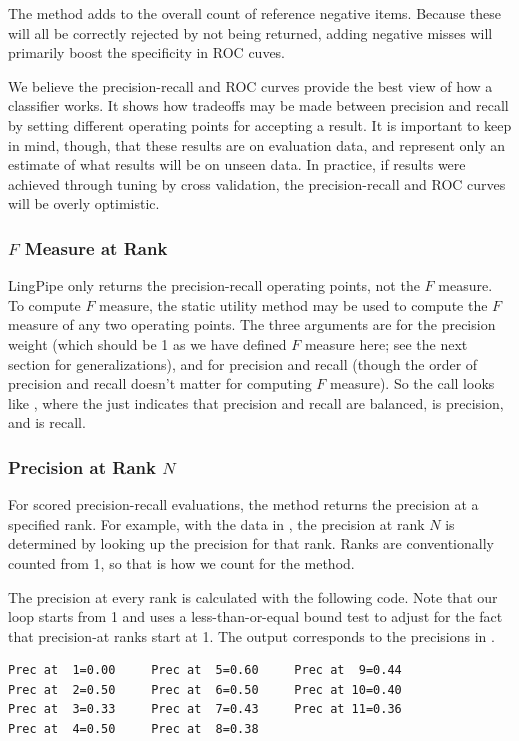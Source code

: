 The method  adds to the overall count of
reference negative items.  Because these will all be correctly
rejected by not being returned, adding negative misses will primarily
boost the specificity in ROC cuves.  

We believe the precision-recall and ROC curves provide the best view
of how a classifier works.  It shows how tradeoffs may be made between
precision and recall by setting different operating points for
accepting a result.  It is important to keep in mind, though, that
these results are on evaluation data, and represent only an estimate
of what results will be on unseen data.  In practice, if results were
achieved through tuning by cross validation, the precision-recall and
ROC curves will be overly optimistic.


\subsubsection{$F$ Measure at Rank}

LingPipe only returns the precision-recall operating points, not the
$F$ measure.  To compute $F$ measure, the static utility method
 may be used to compute the $F$
measure of any two operating points.  The three arguments are for the
precision weight (which should be 1 as we have defined $F$ measure
here; see the next section for generalizations), and for precision and
recall (though the order of precision and recall doesn't matter for
computing $F$ measure). So the call looks like
, where the  just indicates that
precision and recall are balanced,  is precision, and 
is recall.

\subsubsection{Precision at Rank $N$}

For scored precision-recall evaluations, the method
 returns the precision at a specified rank.
For example, with the data in , the
precision at rank $N$ is determined by looking up the precision for
that rank.  Ranks are conventionally counted from 1, so that is how we
count for the  method.

The precision at every rank is calculated with the following code.
%
%
Note that our loop starts from 1 and uses a less-than-or-equal bound
test to adjust for the fact that precision-at ranks start at 1.  The
output corresponds to the precisions in .
%
\begin{verbatim}
Prec at  1=0.00     Prec at  5=0.60     Prec at  9=0.44
Prec at  2=0.50     Prec at  6=0.50     Prec at 10=0.40
Prec at  3=0.33     Prec at  7=0.43     Prec at 11=0.36
Prec at  4=0.50     Prec at  8=0.38
\end{verbatim}
%

